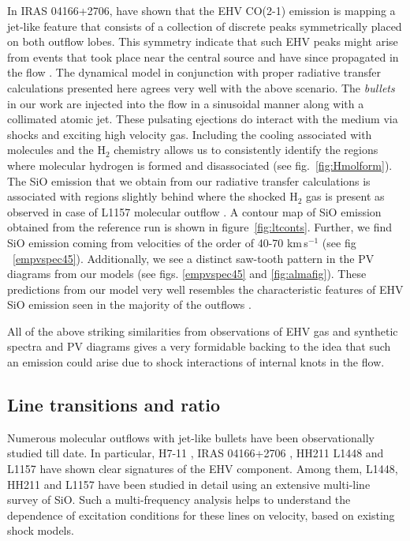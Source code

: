 \documentclass[useAMS,usenatbib]{mn2e}
\begin{document}
In IRAS 04166+2706, \cite{SantiagoGarcia:2009p13972} have shown 
that the EHV CO(2-1) emission is mapping a jet-like
feature that consists of a collection of
discrete peaks symmetrically placed on both outflow lobes. This symmetry
indicate that such EHV peaks might arise from events that took place
near the central source and have since propagated in the flow
\citep{Bachiller:1990p11196, Tafalla:2011p14051}. The dynamical 
model in conjunction with proper radiative transfer calculations presented here 
agrees very well with the above scenario. The {\em{bullets}} in our
work are injected into the flow in a sinusoidal manner along with a
collimated atomic jet. These pulsating ejections do interact with the medium
via shocks and exciting high velocity gas. Including the cooling associated with
molecules and the H$_{2}$ chemistry allows us to
consistently identify the regions where molecular hydrogen is formed
and disassociated (see fig.~\ref{fig:Hmolform}). The SiO emission that we
obtain from our radiative transfer calculations is associated with
regions slightly behind where the shocked H$_{2}$ gas is present
as observed in case of L1157 molecular outflow
\cite{Gueth:1998p14058}. A contour map of SiO
emission obtained from the reference run is shown in
figure~\ref{fig:ltconts}. Further, we find SiO emission coming from velocities 
of the order of 40-70 km\,s$^{-1}$ (see fig
~\ref{empvspec45}). Additionally, we see a distinct saw-tooth pattern
in the PV diagrams from our models (see figs. \ref{empvspec45} and
\ref{fig:almafig}). These predictions from our model very well
resembles the characteristic features of EHV SiO emission 
seen in the majority of the outflows \citep{SantiagoGarcia:2009p13972,
  Tafalla:2011p14051, Arce:2013p14902}.
%

All of the above striking similarities from observations of EHV gas
and synthetic spectra and PV diagrams gives a very formidable backing
to the idea that such an emission could arise due to shock interactions of
internal knots in the flow. 

\subsection{Line transitions and ratio}
Numerous molecular outflows with jet-like bullets have been
observationally studied till date. In particular, H7-11
\citep{Bachiller:1998p14725}, IRAS 04166+2706
\citep{SantiagoGarcia:2009p13972, Tafalla:2010p14759}, HH211 \citep{Nisini:2002p14418}
L1448 \citep{Bachiller:1991p14732,Nisini:2007p13128,
  Tafalla:2010p14759} and L1157 \citep{Nisini:2007p13128} have
shown clear signatures of the EHV component. Among them, L1448, HH211 and
L1157 have been studied in detail using an extensive multi-line
survey of SiO. Such a multi-frequency analysis helps to understand the dependence of
excitation conditions for these lines on velocity, based on existing shock
models.  
%
\end{document}
